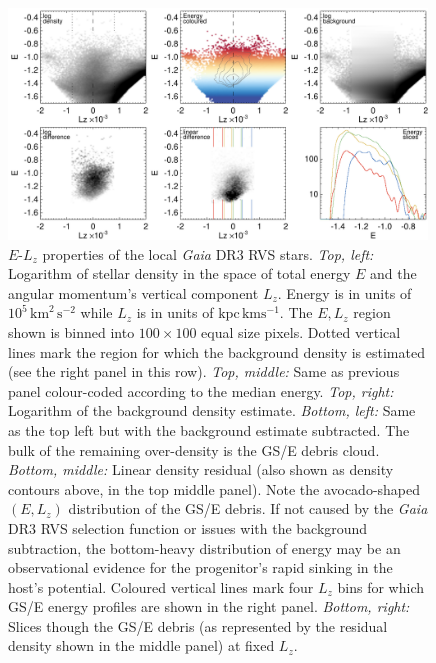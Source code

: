 \documentclass[a4paper,useAMS,usenatbib]{mnras}
\begin{document}
%
\begin{figure}
  \centering
  \includegraphics[width=0.99\textwidth]{img/elz_reveal.pdf}
  \caption[]{$E$-$L_z$ properties of the local {\it Gaia} DR3 RVS stars. {\it Top, left:} Logarithm of stellar density in the space of total energy $E$ and the angular momentum's vertical component $L_z$. Energy is in units of $10^5\, \mathrm{km}^2\,\mathrm{s}^{-2}$ while $L_z$ is in units of $\mathrm{kpc}\,\mathrm{km}\mathrm{ s}^{-1}$. The $E, L_z$ region shown is binned into $100\times100$ equal size pixels. Dotted vertical lines mark the region for which the background density is estimated (see the right panel in this row). {\it Top, middle:} Same as previous panel colour-coded according to the median energy. {\it Top, right:} Logarithm of the background density estimate. {\it Bottom, left:} Same as the top left but with the background estimate subtracted. The bulk of the remaining over-density is the GS/E debris cloud. {\it Bottom, middle:} Linear density residual (also shown as density contours above, in the top middle panel). Note the avocado-shaped $(E,L_z)$ distribution of the GS/E debris. If not caused by the {\it Gaia} DR3 RVS selection function or issues with the background subtraction, the bottom-heavy distribution of energy may be an observational evidence for the progenitor's rapid sinking in the host's potential. Coloured vertical lines mark four $L_z$ bins for which GS/E energy profiles are shown in the right panel. {\it Bottom, right:} Slices though the GS/E debris (as represented by the residual density shown in the middle panel) at fixed $L_z$.
  }
   \label{fig:elz}
\end{figure}
%
\end{document}
